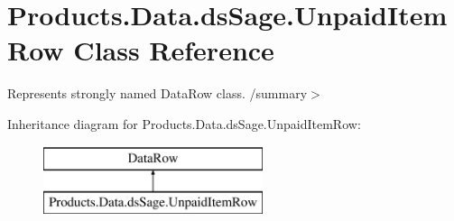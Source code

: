 \hypertarget{class_products_1_1_data_1_1ds_sage_1_1_unpaid_item_row}{}\section{Products.\+Data.\+ds\+Sage.\+Unpaid\+Item\+Row Class Reference}
\label{class_products_1_1_data_1_1ds_sage_1_1_unpaid_item_row}


Represents strongly named Data\+Row class. /summary$>$  


Inheritance diagram for Products.\+Data.\+ds\+Sage.\+Unpaid\+Item\+Row\+:\begin{figure}[H]
\begin{center}
\leavevmode
\includegraphics[height=2.000000cm]{class_products_1_1_data_1_1ds_sage_1_1_unpaid_item_row}
\end{center}
\end{figure}
